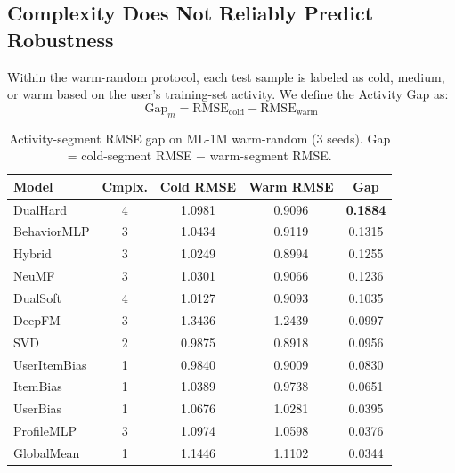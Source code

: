 \documentclass[journal]{IEEEtran}
\begin{document}
\subsection{Complexity Does Not Reliably Predict Robustness}
\label{sec:gap}

Within the warm-random protocol, each test sample is labeled as cold, medium, or warm based on the user's training-set activity. We define the Activity Gap as:
\begin{equation}
\mathrm{Gap}_m = \mathrm{RMSE}_{\mathrm{cold}} - \mathrm{RMSE}_{\mathrm{warm}}
\label{eq:gap}
\end{equation}

\begin{table}[!t]
\centering
\caption{Activity-segment RMSE gap on ML-1M warm-random (3 seeds). Gap = cold-segment RMSE $-$ warm-segment RMSE.}
\label{tab:gap}
\footnotesize
\begin{tabular}{@{}lcccc@{}}
\toprule
Model & {Cmplx.} & {Cold RMSE} & {Warm RMSE} & {Gap} \\
\midrule
DualHard      & 4 & 1.0981 & 0.9096 & \textbf{0.1884} \\
BehaviorMLP   & 3 & 1.0434 & 0.9119 & 0.1315 \\
Hybrid        & 3 & 1.0249 & 0.8994 & 0.1255 \\
NeuMF         & 3 & 1.0301 & 0.9066 & 0.1236 \\
DualSoft      & 4 & 1.0127 & 0.9093 & 0.1035 \\
DeepFM        & 3 & 1.3436 & 1.2439 & 0.0997 \\
SVD           & 2 & 0.9875 & 0.8918 & 0.0956 \\
UserItemBias  & 1 & 0.9840 & 0.9009 & 0.0830 \\
ItemBias      & 1 & 1.0389 & 0.9738 & 0.0651 \\
UserBias      & 1 & 1.0676 & 1.0281 & 0.0395 \\
ProfileMLP    & 3 & 1.0974 & 1.0598 & 0.0376 \\
GlobalMean    & 1 & 1.1446 & 1.1102 & 0.0344 \\
\bottomrule
\end{tabular}
\end{table}
\end{document}
